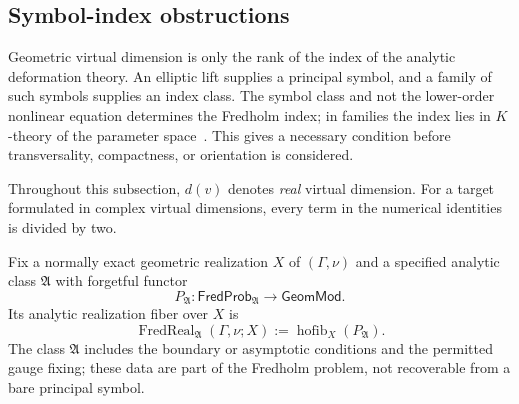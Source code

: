 \documentclass[11pt,letterpaper,twoside]{article}
\theoremstyle{plain}
\theoremstyle{definition}
\theoremstyle{remark}
\let\cite\citep
\newcommand{\GeomMod}{\mathsf{GeomMod}}
\newcommand{\FredProb}{\mathsf{FredProb}}
\DeclareMathOperator{\hofib}{hofib}
\begin{document}
\subsection{Symbol-index obstructions}

Geometric virtual dimension is only the rank of the index of the analytic deformation theory.  An elliptic lift supplies a principal symbol, and a family of such symbols supplies an index class.  The symbol class and not the lower-order nonlinear equation determines the Fredholm index; in families the index lies in $K$-theory of the parameter space~\cite{atiyahsinger1968i,atiyahsinger1971iv}.  This gives a necessary condition before transversality, compactness, or orientation is considered.

Throughout this subsection, $d(v)$ denotes \emph{real} virtual dimension.  For a target formulated in complex virtual dimensions, every term in the numerical identities is divided by two.

Fix a normally exact geometric realization $X$ of $(\Gamma,\nu)$ and a specified analytic class $\mathfrak A$ with forgetful functor
\[
 P_{\mathfrak A}:\FredProb_{\mathfrak A}\longrightarrow\GeomMod.
\]
Its analytic realization fiber over $X$ is
\begin{equation}\label{eq:elliptic-realization-fiber}
 \operatorname{FredReal}_{\mathfrak A}(\Gamma,\nu;X)
 :=\hofib_X(P_{\mathfrak A}).
\end{equation}
The class $\mathfrak A$ includes the boundary or asymptotic conditions and the permitted gauge fixing; these data are part of the Fredholm problem, not recoverable from a bare principal symbol.
\end{document}
